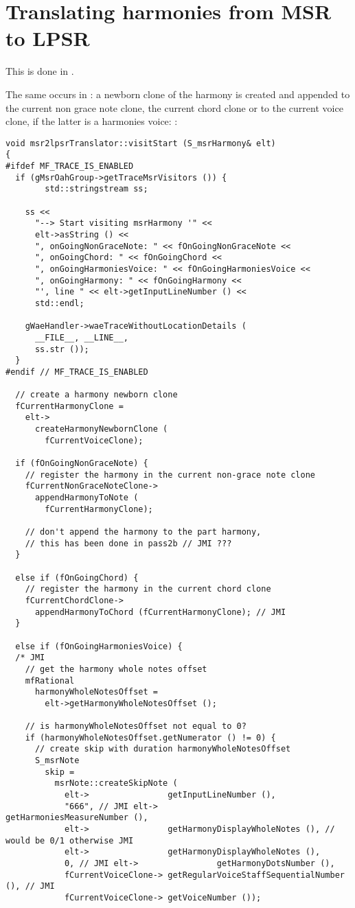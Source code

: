\section{Translating harmonies from MSR to LPSR}

This is done in \msrToLpsr{}.

The same occurs in : a newborn clone of the harmony is created and appended to the current non grace note clone, the current chord clone or to the current voice clone, if the latter is a harmonies voice: %
:
\begin{lstlisting}[language=CPlusPlus]
void msr2lpsrTranslator::visitStart (S_msrHarmony& elt)
{
#ifdef MF_TRACE_IS_ENABLED
  if (gMsrOahGroup->getTraceMsrVisitors ()) {
		std::stringstream ss;

    ss <<
      "--> Start visiting msrHarmony '" <<
      elt->asString () <<
      ", onGoingNonGraceNote: " << fOnGoingNonGraceNote <<
      ", onGoingChord: " << fOnGoingChord <<
      ", onGoingHarmoniesVoice: " << fOnGoingHarmoniesVoice <<
      ", onGoingHarmony: " << fOnGoingHarmony <<
      "', line " << elt->getInputLineNumber () <<
      std::endl;

    gWaeHandler->waeTraceWithoutLocationDetails (
      __FILE__, __LINE__,
      ss.str ());
  }
#endif // MF_TRACE_IS_ENABLED

  // create a harmony newborn clone
  fCurrentHarmonyClone =
    elt->
      createHarmonyNewbornClone (
        fCurrentVoiceClone);

  if (fOnGoingNonGraceNote) {
    // register the harmony in the current non-grace note clone
    fCurrentNonGraceNoteClone->
      appendHarmonyToNote (
        fCurrentHarmonyClone);

    // don't append the harmony to the part harmony,
    // this has been done in pass2b // JMI ???
  }

  else if (fOnGoingChord) {
    // register the harmony in the current chord clone
    fCurrentChordClone->
      appendHarmonyToChord (fCurrentHarmonyClone); // JMI
  }

  else if (fOnGoingHarmoniesVoice) {
  /* JMI
    // get the harmony whole notes offset
    mfRational
      harmonyWholeNotesOffset =
        elt->getHarmonyWholeNotesOffset ();

    // is harmonyWholeNotesOffset not equal to 0?
    if (harmonyWholeNotesOffset.getNumerator () != 0) {
      // create skip with duration harmonyWholeNotesOffset
      S_msrNote
        skip =
          msrNote::createSkipNote (
            elt->                getInputLineNumber (),
            "666", // JMI elt->                getHarmoniesMeasureNumber (),
            elt->                getHarmonyDisplayWholeNotes (), // would be 0/1 otherwise JMI
            elt->                getHarmonyDisplayWholeNotes (),
            0, // JMI elt->                getHarmonyDotsNumber (),
            fCurrentVoiceClone-> getRegularVoiceStaffSequentialNumber (), // JMI
            fCurrentVoiceClone-> getVoiceNumber ());


\end{lstlisting}
